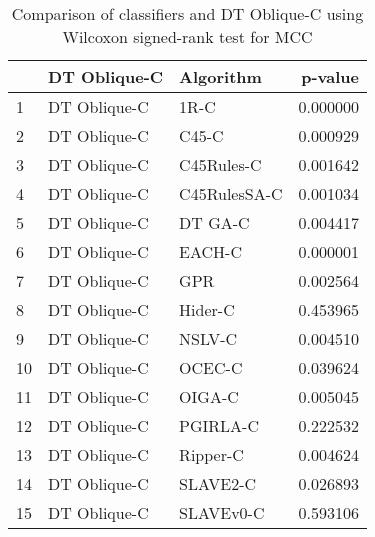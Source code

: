 \begin{table}
\footnotesize
\caption{Comparison of classifiers and DT Oblique-C using Wilcoxon signed-rank test for MCC}
\label{tab:DT Oblique-C wilcoxon MCC comparison}
\begin{tabular}{lllr}
\hline
 & DT Oblique-C & Algorithm & p-value \\
\hline
1 & DT Oblique-C & 1R-C & 0.000000 \\
2 & DT Oblique-C & C45-C & 0.000929 \\
3 & DT Oblique-C & C45Rules-C & 0.001642 \\
4 & DT Oblique-C & C45RulesSA-C & 0.001034 \\
5 & DT Oblique-C & DT GA-C & 0.004417 \\
6 & DT Oblique-C & EACH-C & 0.000001 \\
7 & DT Oblique-C & GPR & 0.002564 \\
8 & DT Oblique-C & Hider-C & 0.453965 \\
9 & DT Oblique-C & NSLV-C & 0.004510 \\
10 & DT Oblique-C & OCEC-C & 0.039624 \\
11 & DT Oblique-C & OIGA-C & 0.005045 \\
12 & DT Oblique-C & PGIRLA-C & 0.222532 \\
13 & DT Oblique-C & Ripper-C & 0.004624 \\
14 & DT Oblique-C & SLAVE2-C & 0.026893 \\
15 & DT Oblique-C & SLAVEv0-C & 0.593106 \\
\hline
\end{tabular}
\end{table}
